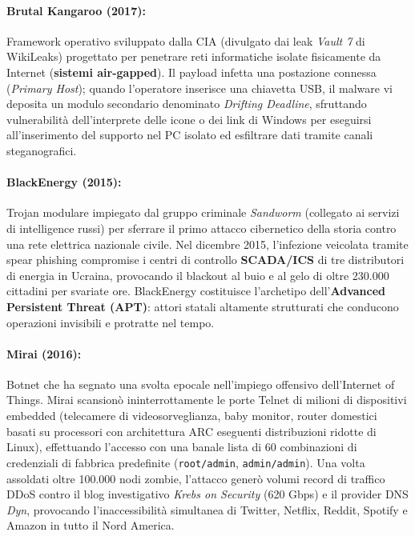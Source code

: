 \documentclass[../../main.tex]{subfiles}
\begin{document}
\paragraph{Brutal Kangaroo (2017):}
Framework operativo sviluppato dalla CIA (divulgato dai leak \textit{Vault 7} di WikiLeaks) progettato per penetrare reti informatiche isolate fisicamente da Internet (\textbf{sistemi air-gapped}). Il payload infetta una postazione connessa (\textit{Primary Host}); quando l'operatore inserisce una chiavetta USB, il malware vi deposita un modulo secondario denominato \textit{Drifting Deadline}, sfruttando vulnerabilità dell'interprete delle icone o dei link di Windows per eseguirsi all'inserimento del supporto nel PC isolato ed esfiltrare dati tramite canali steganografici.

\paragraph{BlackEnergy (2015):}
Trojan modulare impiegato dal gruppo criminale \textit{Sandworm} (collegato ai servizi di intelligence russi) per sferrare il primo attacco cibernetico della storia contro una rete elettrica nazionale civile. Nel dicembre 2015, l'infezione veicolata tramite spear phishing compromise i centri di controllo \textbf{SCADA/ICS} di tre distributori di energia in Ucraina, provocando il blackout al buio e al gelo di oltre 230.000 cittadini per svariate ore. BlackEnergy costituisce l'archetipo dell'\textbf{Advanced Persistent Threat (APT)}: attori statali altamente strutturati che conducono operazioni invisibili e protratte nel tempo.

\paragraph{Mirai (2016):}
Botnet che ha segnato una svolta epocale nell'impiego offensivo dell'Internet of Things. Mirai scansionò ininterrottamente le porte Telnet di milioni di dispositivi embedded (telecamere di videosorveglianza, baby monitor, router domestici basati su processori con architettura ARC eseguenti distribuzioni ridotte di Linux), effettuando l'accesso con una banale lista di 60 combinazioni di credenziali di fabbrica predefinite (\texttt{root/admin}, \texttt{admin/admin}). Una volta assoldati oltre 100.000 nodi zombie, l'attacco generò volumi record di traffico DDoS contro il blog investigativo \textit{Krebs on Security} (620 Gbps) e il provider DNS \textit{Dyn}, provocando l'inaccessibilità simultanea di Twitter, Netflix, Reddit, Spotify e Amazon in tutto il Nord America.
\end{document}
